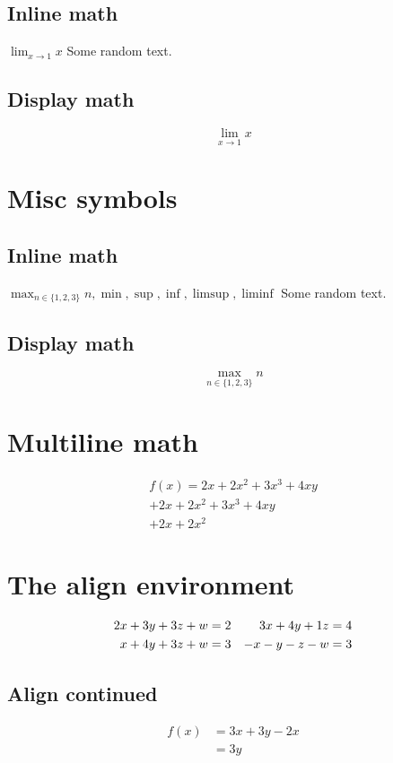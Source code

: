 \documentclass{article}
\theoremstyle{definition}
\theoremstyle{remark}
\begin{document}
  \subsection{Inline math}
    $\lim_{x\to 1}x$ Some random text.

  \subsection{Display math}
    \[\lim_{x\to 1}x\]

\section{Misc symbols}
  \subsection{Inline math}
    $\max_{n\in  \{1,2,3\}}n, \min, \sup, \inf, \limsup, \liminf$ Some random text.

  \subsection{Display math}
    \[\max_{n\in  \{1,2,3\}}n\]

\section{Multiline math}
  \begin{multline}
    f(x) = 2x + 2x^2 + 3x^3 + 4xy \\
      + 2x + 2x^2 + 3x^3 + 4xy \\
      + 2x + 2x^2
  \end{multline}

\section{The align environment}
  \begin{align}
    2x + 3y + 3z + w &= 2  & 3x + 4y + 1z &=4 \\
    x + 4y + 3z + w &= 3 & -x - y - z - w &= 3 \notag
  \end{align}

  \subsection{Align continued}
  \begin{align}
    f(x) &= 3x + 3y - 2x \\
    &= 3y
  \end{align}
\end{document}
